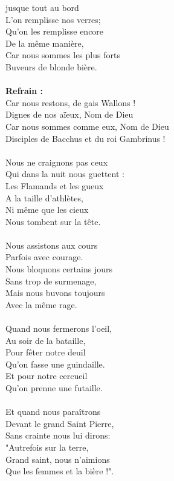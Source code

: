  jusque tout au bord
\\L'on remplisse nos verres;
\\Qu'on les remplisse encore
\\De la même manière,
\\Car nous sommes les plus forts
\\Buveurs de blonde bière.
\\\\\textbf{Refrain :}
\\Car nous restons, de gais Wallons !
\\Dignes de nos aïeux, Nom de Dieu
\\Car nous sommes comme eux, Nom de Dieu
\\Disciples de Bacchus et du roi Gambrinus !
\\\\Nous ne craignons pas ceux
\\Qui dans la nuit nous guettent :
\\Les Flamands et les gueux
\\A la taille d'athlètes,
\\Ni même que les cieux
\\Nous tombent sur la tête.
\\\\Nous assistons aux cours
\\Parfois avec courage.
\\Nous bloquons certains jours
\\Sans trop de surmenage,
\\Mais nous buvons toujours
\\Avec la même rage.
\\\\Quand nous fermerons l'oeil,
\\Au soir de la bataille,
\\Pour fêter notre deuil
\\Qu'on fasse une guindaille.
\\Et pour notre cercueil
\\Qu'on prenne une futaille.
\\\\Et quand nous paraîtrons
\\Devant le grand Saint Pierre,
\\Sans crainte nous lui dirons:
\\"Autrefois sur la terre,
\\Grand saint, nous n'aimions
\\Que les femmes et la bière !".
